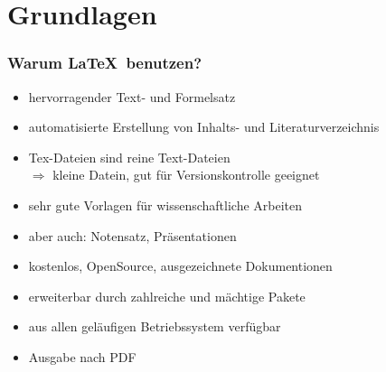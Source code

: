 \section{Grundlagen}
\begin{frame}
    \frametitle{Warum \LaTeX \ benutzen?}
    \begin{itemize}
        \item hervorragender Text- und Formelsatz
        \item automatisierte Erstellung von Inhalts- und Literaturverzeichnis
        \item Tex-Dateien sind reine Text-Dateien \\
              $\Rightarrow$ kleine Datein, gut für Versionskontrolle geeignet
        \item sehr gute Vorlagen für wissenschaftliche Arbeiten 
        \item aber auch: Notensatz, Präsentationen 
        \item kostenlos, OpenSource, ausgezeichnete Dokumentionen
        \item erweiterbar durch zahlreiche und mächtige Pakete
        \item aus allen geläufigen Betriebssystem verfügbar
        \item Ausgabe nach PDF
    \end{itemize}
\end{frame}

